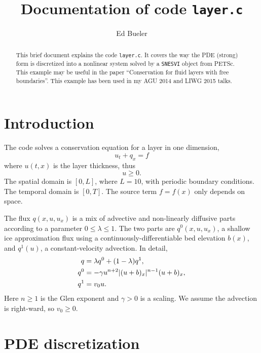 \documentclass[11pt]{amsart}
\title{Documentation of code \texttt{layer.c}}
\author{Ed Bueler}
\begin{document}
\begin{abstract}
This brief document explains the code \texttt{layer.c}.  It covers the way the PDE (strong) form is discretized into a nonlinear system solved by a \texttt{SNESVI} object from PETSc.  This example may be useful in the paper ``Conservation for fluid layers with free boundaries''.  This example has been used in my AGU 2014 and LIWG 2015 talks.
\end{abstract}

\maketitle

\thispagestyle{empty}


\section{Introduction}

The code solves a conservation equation for a layer in one dimension,
\begin{equation}
u_t + q_x = f  \label{eq:conserve}
\end{equation}
where $u(t,x)$ is the layer thickness, thus
\begin{equation}
u \ge 0. \label{eq:constraint}
\end{equation}
The spatial domain is $[0,L]$, where $L=10$, with periodic boundary conditions.  The temporal domain is $[0,T]$.  The source term $f=f(x)$ only depends on space.

The flux $q(x,u,u_x)$ is a mix of advective and non-linearly diffusive parts according to a parameter $0\le \lambda \le 1$.  The two parts are $q^0(x,u,u_x)$, a shallow ice approximation flux using a continuously-differentiable bed elevation $b(x)$, and $q^1(u)$, a constant-velocity advection.  In detail,
\begin{align}
    q &= \lambda q^0 + (1-\lambda) q^1,  \label{eq:fluxform} \\
  q^0 &= - \gamma u^{n+2} |(u+b)_x|^{n-1} (u+b)_x, \notag \\
  q^1 &= v_0 u. \notag
\end{align}
Here $n\ge 1$ is the Glen exponent and $\gamma>0$ is a scaling.  We assume the advection is right-ward, so $v_0 \ge 0$.


\section{PDE discretization}
\end{document}

